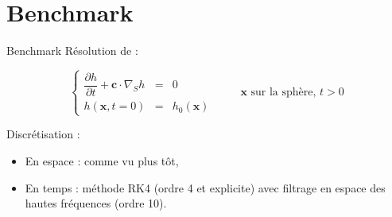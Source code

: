 \documentclass[11pt]{beamer}
\begin{document}
\section{Benchmark}
\begin{frame}{Benchmark}
Résolution de :

$$\left\{
\begin{array}{rcl}
\dfrac{\partial h}{\partial t} + \mathbf{c} \cdot \nabla_S h & = & 0 \\
h(\mathbf{x},t=0) & = & h_0 ( \mathbf{x} )
\end{array}
\right. \hspace{1cm} \mathbf{x} \text{ sur la sphère, } t>0$$

\pause

\begin{block}{Discrétisation : }

\begin{itemize}
\item En espace : comme vu plus tôt,

\item En temps : méthode RK4 (ordre 4 et explicite) avec filtrage en espace des hautes fréquences (ordre 10).
\end{itemize}
\end{block}

\end{frame}

\end{document}
